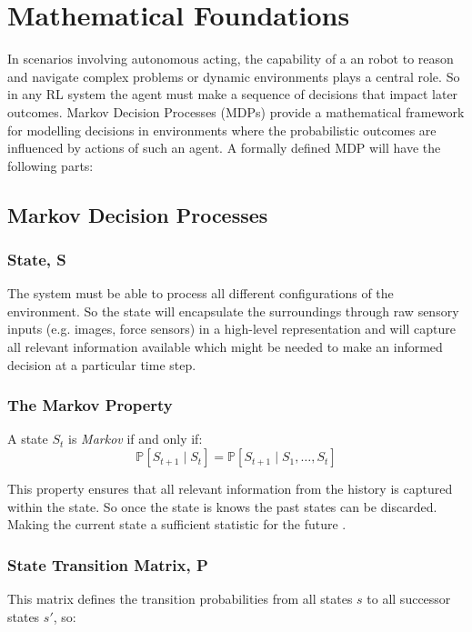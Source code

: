 \section{Mathematical Foundations}

  In scenarios involving autonomous acting, the capability of a an robot to reason and navigate complex problems or dynamic environments plays a central role. So in any RL system the agent must make a sequence of decisions that impact later outcomes. Markov Decision Processes (MDPs) provide a mathematical framework for modelling decisions in environments where the probabilistic outcomes are influenced by actions of such an agent. A formally defined MDP will have the following parts:

\subsection{Markov Decision Processes}\label{sec:mdp}
  \subsubsection{State, S}
    The system must be able to process all different configurations of the environment. So the state will encapsulate the surroundings through raw sensory inputs (e.g. images, force sensors) in a high-level representation and will capture all relevant information available \cite{Sutton1998} which might be needed to make an informed decision at a particular time step.

  \subsubsection{The Markov Property}
    A state $S_t$ is \emph{Markov} if and only if:
    \[
      \mathbb{P} \left[S_{t+1} \mid S_t\right] = \mathbb{P}\left[ S_{t+1} \mid S_1, \ldots, S_t\right]
    \]

    This property ensures that all relevant information from the history is captured within the state. So once the state is knows the past states can be discarded. Making the current state a sufficient statistic for the future \cite{silver2015}.

  \subsubsection{State Transition Matrix, P}
    This matrix defines the transition probabilities from all states $s$ to all successor states $s'$, so:
    
